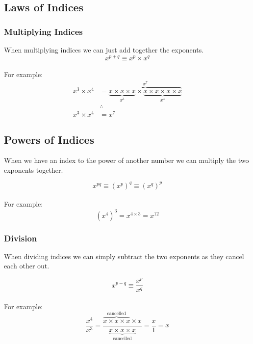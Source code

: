 \documentclass[a4paper]{article}
\begin{document}
\subsection{Laws of Indices}

\subsubsection{Multiplying Indices}

When multiplying indices we can just add together the exponents.
\begin{equation}
	x^{p + q} \equiv x^{p} \times x^{q}
\end{equation}
\\
For example:
\begin{align*}
	x^3 \times x^4 &= \overbrace{
		\underbrace{x \times x \times x}_{x^3} \times
		\underbrace{x \times x \times x \times x}_{x^4}}^{x^7}\\
	&\therefore\\
	x^3 \times x^4 &= x^7
\end{align*}

\subsection{Powers of Indices}
When we have an index to the power of another number we can multiply the two exponents together.

\begin{equation}
	x^{pq} \equiv (x^{p})^{q} \equiv (x^{q})^{p} 
\end{equation}
\\
For example:
\begin{equation}
	(x^4)^3 = x^{4 \times 3} = x^{12}
\end{equation}

\subsubsection{Division}
When dividing indices we can simply subtract the two exponents as they cancel each other out.

\begin{equation}
	x^{p - q} \equiv \frac{x^{p}}{x^{q}}
\end{equation}
\\
For example:
\begin{equation}
	\frac{x^4}{x^3} = \frac
		{\overbrace{x \times x \times x}^\text{cancelled} \times x}
		{\underbrace{x \times x \times x}_\text{cancelled}}
		= \frac{x}{1} = x
\end{equation}
\end{document}
